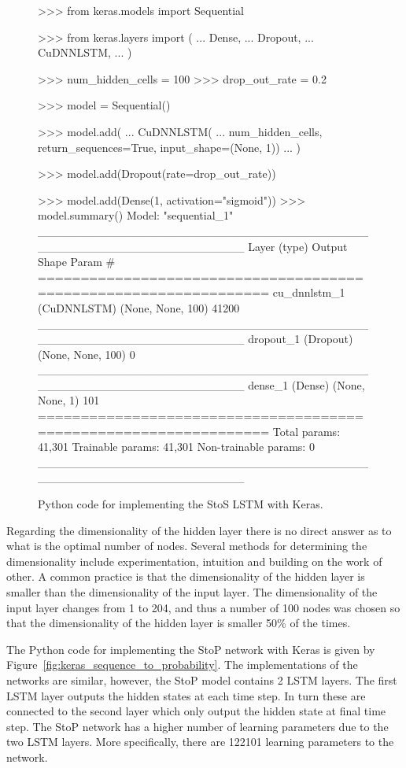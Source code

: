\begin{figure}[!htbp]
\begin{usagepy}
>>> from keras.models import Sequential

>>> from keras.layers import (
...     Dense,
...     Dropout,
...     CuDNNLSTM,
... )

>>> num_hidden_cells = 100
>>> drop_out_rate = 0.2

>>> model = Sequential()

>>> model.add(
...    CuDNNLSTM(
...        num_hidden_cells, return_sequences=True, input_shape=(None, 1))
... )

>>> model.add(Dropout(rate=drop_out_rate))

>>> model.add(Dense(1, activation="sigmoid"))
>>> model.summary()
Model: "sequential_1"
_________________________________________________________________
Layer (type)                 Output Shape              Param #   
=================================================================
cu_dnnlstm_1 (CuDNNLSTM)     (None, None, 100)         41200     
_________________________________________________________________
dropout_1 (Dropout)          (None, None, 100)         0         
_________________________________________________________________
dense_1 (Dense)              (None, None, 1)           101       
=================================================================
Total params: 41,301
Trainable params: 41,301
Non-trainable params: 0
_________________________________________________________________

\end{usagepy}
\caption{Python code for implementing the StoS LSTM with Keras.}\label{fig:keras_sequence_to_sequence}
\end{figure}

Regarding the dimensionality of the hidden layer there is no direct answer as to
what is the optimal number of nodes. Several methods for determining the
dimensionality include experimentation, intuition and building on the work of
other. A common practice is that the dimensionality of the hidden layer is
smaller than the dimensionality of the input layer. The dimensionality of the
input layer changes from 1 to 204, and thus a number of 100 nodes was chosen
so that the dimensionality of the hidden layer is smaller 50\% of the times.

The Python code for implementing the StoP network with Keras is given by
Figure~\ref{fig:keras_sequence_to_probability}. The implementations of the
networks are similar, however, the StoP model contains 2 LSTM layers. The first
LSTM layer outputs the hidden states at each time step. In turn these are connected to
the second layer which only output the hidden state at final time step. The StoP
network has a higher number of learning parameters due to the two LSTM layers.
More specifically, there are 122101 learning parameters to the network.


